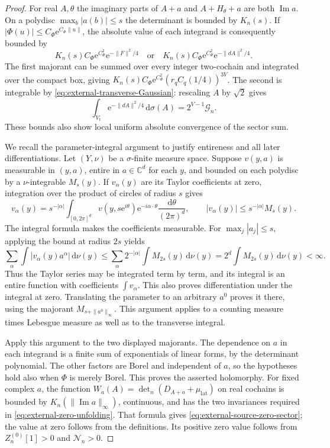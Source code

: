 \documentclass[11pt,letterpaper,reqno]{amsart}
\newcommand{\C}{\mathbb C}
\newcommand{\dd}{\mathrm d}
\begin{document}
\begin{proof}
For real $A,\theta$ the imaginary parts of $A+a$ and
$A+H_\theta+a$ are both $\operatorname{Im}a$. On a
polydisc $\max_b|a(b)|\le s$ the determinant is
bounded by $K_n(s)$. If
$|\Phi(u)|\le C_\Phi \mathrm e^{C_\Phi\|u\|}$, the absolute
value of each integrand is consequently bounded by
\[
 K_n(s)C_\Phi \mathrm e^{C_\Phi^2}\mathrm e^{-\|F\|^2/4}
 \quad\text{or}\quad
 K_n(s)C_\Phi \mathrm e^{C_\Phi^2}\mathrm e^{-\|dA\|^2/4}.
\]
The first majorant can be summed over every integer
two-cochain and integrated over the compact box,
giving
$K_n(s)C_\Phi \mathrm e^{C_\Phi^2}(r_qC_q(1/4))^{3V}$.
The second is integrable by
\eqref{eq:external-transverse-Gaussian}: rescaling
$A$ by $\sqrt2$ gives
\[
 \int_{V_{\mathrm t}}\mathrm e^{-\|dA\|^2/4}\,\dd\sigma(A)
                          =2^{V-1}\mathcal G_n.
\]
These bounds also show local uniform absolute
convergence of the sector sum.

We recall the parameter-integral argument to justify
entireness and all later differentiations. Let
$(Y,\nu)$ be a $\sigma$-finite measure space. Suppose
$v(y,a)$ is measurable in $(y,a)$, entire in
$a\in\C^d$ for each $y$, and bounded on each
polydisc by a $\nu$-integrable $M_s(y)$. If $v_\alpha(y)$
are its Taylor coefficients at zero, integration
over the product of circles of radius $s$ gives
\[
 v_\alpha(y)=s^{-|\alpha|}
       \int_{[0,2\pi]^d}
       v(y,s\mathrm e^{i\theta})\mathrm e^{-i\alpha\cdot\theta}
                         \frac{\dd\theta}{(2\pi)^d},
 \qquad |v_\alpha(y)|\le s^{-|\alpha|}M_s(y).
\]
The integral formula makes the coefficients measurable.
For $\max_j|a_j|\le s$, applying the bound at radius
$2s$ yields
\[
 \sum_\alpha\int|v_\alpha(y)a^\alpha|\,\dd\nu(y)
       \le\sum_\alpha2^{-|\alpha|}\int M_{2s}(y)\,\dd\nu(y)
       =2^d\int M_{2s}(y)\,\dd\nu(y)<\infty.
\]
Thus the Taylor series may be integrated term by term,
and its integral is an entire function with coefficients
$\int v_\alpha$. This also proves differentiation under
the integral at zero. Translating the parameter to an
arbitrary $a^0$ proves it there, using the majorant
$M_{s+\|a^0\|_\infty}$. This argument applies to a
counting measure times Lebesgue measure as well as to
the transverse integral.

Apply this argument to the two displayed majorants.
The dependence on $a$ in each integrand is a finite
sum of exponentials of linear forms, by the determinant
polynomial. The other factors are Borel and independent
of $a$, so the hypotheses hold also when $\Phi$ is
merely Borel. This proves the asserted holomorphy.
For fixed complex $a$, the function
$W_a(A)=\det_n(D_{A+a}+\mu_{\mathrm{lat}})$ on real
cochains is bounded by $K_n(\|\operatorname{Im}a\|_\infty)$,
continuous, and has the two invariances required in
\eqref{eq:external-zero-unfolding}. That formula gives
\eqref{eq:external-source-zero-sector}; the value at zero
follows from the definitions. Its positive zero value
follows from $Z_n^{(0)}[1]>0$ and $\mathcal N_n>0$.
\end{proof}
\end{document}

